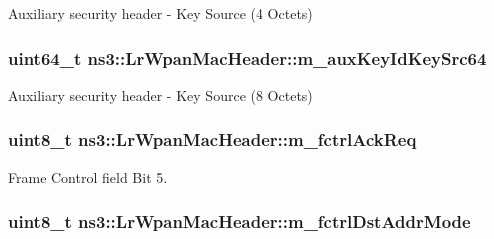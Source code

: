 Auxiliary security header -\/ Key Source (4 Octets) 

\subsubsection[{\texorpdfstring{m\+\_\+aux\+Key\+Id\+Key\+Src64}{m_auxKeyIdKeySrc64}}]{\setlength{\rightskip}{0pt plus 5cm}uint64\+\_\+t ns3\+::\+Lr\+Wpan\+Mac\+Header\+::m\+\_\+aux\+Key\+Id\+Key\+Src64}\hypertarget{classns3_1_1LrWpanMacHeader_a954dcb9d52a23143aaabae58e9858115}{}\label{classns3_1_1LrWpanMacHeader_a954dcb9d52a23143aaabae58e9858115}


Auxiliary security header -\/ Key Source (8 Octets) 

\subsubsection[{\texorpdfstring{m\+\_\+fctrl\+Ack\+Req}{m_fctrlAckReq}}]{\setlength{\rightskip}{0pt plus 5cm}uint8\+\_\+t ns3\+::\+Lr\+Wpan\+Mac\+Header\+::m\+\_\+fctrl\+Ack\+Req\hspace{0.3cm}{\ttfamily [private]}}\hypertarget{classns3_1_1LrWpanMacHeader_a450be60713dd9f187f80f9bcf4c3b1cc}{}\label{classns3_1_1LrWpanMacHeader_a450be60713dd9f187f80f9bcf4c3b1cc}


Frame Control field Bit 5. 

\subsubsection[{\texorpdfstring{m\+\_\+fctrl\+Dst\+Addr\+Mode}{m_fctrlDstAddrMode}}]{\setlength{\rightskip}{0pt plus 5cm}uint8\+\_\+t ns3\+::\+Lr\+Wpan\+Mac\+Header\+::m\+\_\+fctrl\+Dst\+Addr\+Mode\hspace{0.3cm}{\ttfamily [private]}}\hypertarget{classns3_1_1LrWpanMacHeader_a02618462ab859dbb5cacffb93c73a209}{}\label{classns3_1_1LrWpanMacHeader_a02618462ab859dbb5cacffb93c73a209}



